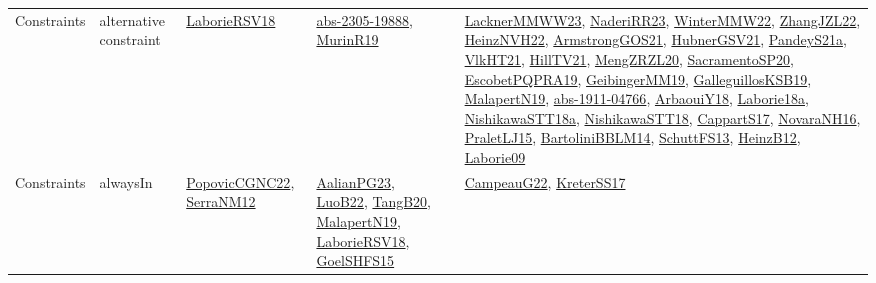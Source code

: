 {\begin{longtable}{lp{3cm}>{\raggedright}p{6cm}>{\raggedright}p{6cm}p{8cm}}
Constraints & alternative constraint & \href{articles/LaborieRSV18.pdf}{LaborieRSV18}\cite{LaborieRSV18} & \href{articles/abs-2305-19888.pdf}{abs-2305-19888}\cite{abs-2305-19888}, \href{papers/MurinR19.pdf}{MurinR19}\cite{MurinR19} & \href{articles/LacknerMMWW23.pdf}{LacknerMMWW23}\cite{LacknerMMWW23}, \href{articles/NaderiRR23.pdf}{NaderiRR23}\cite{NaderiRR23}, \href{papers/WinterMMW22.pdf}{WinterMMW22}\cite{WinterMMW22}, \href{papers/ZhangJZL22.pdf}{ZhangJZL22}\cite{ZhangJZL22}, \href{articles/HeinzNVH22.pdf}{HeinzNVH22}\cite{HeinzNVH22}, \href{papers/ArmstrongGOS21.pdf}{ArmstrongGOS21}\cite{ArmstrongGOS21}, \href{articles/HubnerGSV21.pdf}{HubnerGSV21}\cite{HubnerGSV21}, \href{articles/PandeyS21a.pdf}{PandeyS21a}\cite{PandeyS21a}, \href{articles/VlkHT21.pdf}{VlkHT21}\cite{VlkHT21}, \href{papers/HillTV21.pdf}{HillTV21}\cite{HillTV21}, \href{articles/MengZRZL20.pdf}{MengZRZL20}\cite{MengZRZL20}, \href{articles/SacramentoSP20.pdf}{SacramentoSP20}\cite{SacramentoSP20}, \href{articles/EscobetPQPRA19.pdf}{EscobetPQPRA19}\cite{EscobetPQPRA19}, \href{papers/GeibingerMM19.pdf}{GeibingerMM19}\cite{GeibingerMM19}, \href{papers/GalleguillosKSB19.pdf}{GalleguillosKSB19}\cite{GalleguillosKSB19}, \href{papers/MalapertN19.pdf}{MalapertN19}\cite{MalapertN19}, \href{articles/abs-1911-04766.pdf}{abs-1911-04766}\cite{abs-1911-04766}, \href{papers/ArbaouiY18.pdf}{ArbaouiY18}\cite{ArbaouiY18}, \href{papers/Laborie18a.pdf}{Laborie18a}\cite{Laborie18a}, \href{papers/NishikawaSTT18a.pdf}{NishikawaSTT18a}\cite{NishikawaSTT18a}, \href{papers/NishikawaSTT18.pdf}{NishikawaSTT18}\cite{NishikawaSTT18}, \href{papers/CappartS17.pdf}{CappartS17}\cite{CappartS17}, \href{articles/NovaraNH16.pdf}{NovaraNH16}\cite{NovaraNH16}, \href{papers/PraletLJ15.pdf}{PraletLJ15}\cite{PraletLJ15}, \href{papers/BartoliniBBLM14.pdf}{BartoliniBBLM14}\cite{BartoliniBBLM14}, \href{papers/SchuttFS13.pdf}{SchuttFS13}\cite{SchuttFS13}, \href{papers/HeinzB12.pdf}{HeinzB12}\cite{HeinzB12}, \href{papers/Laborie09.pdf}{Laborie09}\cite{Laborie09}\\
Constraints & alwaysIn & \href{papers/PopovicCGNC22.pdf}{PopovicCGNC22}\cite{PopovicCGNC22}, \href{papers/SerraNM12.pdf}{SerraNM12}\cite{SerraNM12} & \href{papers/AalianPG23.pdf}{AalianPG23}\cite{AalianPG23}, \href{papers/LuoB22.pdf}{LuoB22}\cite{LuoB22}, \href{papers/TangB20.pdf}{TangB20}\cite{TangB20}, \href{papers/MalapertN19.pdf}{MalapertN19}\cite{MalapertN19}, \href{articles/LaborieRSV18.pdf}{LaborieRSV18}\cite{LaborieRSV18}, \href{articles/GoelSHFS15.pdf}{GoelSHFS15}\cite{GoelSHFS15} & \href{articles/CampeauG22.pdf}{CampeauG22}\cite{CampeauG22}, \href{articles/KreterSS17.pdf}{KreterSS17}\cite{KreterSS17}\\

\end{longtable}}
